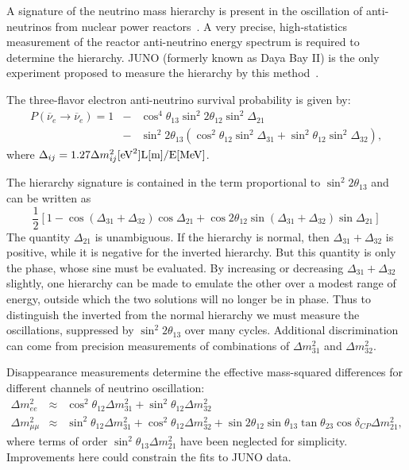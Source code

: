 A signature of the neutrino mass hierarchy is present in the
oscillation of anti-neutrinos from nuclear power
reactors~\cite{jlearned_PRD_2008}.  A very precise, high-statistics
measurement of the reactor anti-neutrino energy spectrum is required
to determine the hierarchy.  JUNO (formerly known as Daya Bay II) is
the only experiment 
proposed to measure the hierarchy by this
method~\cite{yfwang_INPA_2013}.  


The
three-flavor electron anti-neutrino survival probability is given by:
%
\begin{eqnarray} \label{eq:elecSurv}
P(\overline{\nu}_e\rightarrow \overline{\nu}_e) = 1&-&\cos^4\theta_{13}\sin^2 2\theta_{12} \sin^2 \Delta_{21} \nonumber \\
&-&\sin^2 2\theta_{13} (\cos^2\theta_{12}\sin^2 \Delta_{31}+\sin^2\theta_{12}\sin^2{\Delta_{32}}),
\end{eqnarray}
%
where $\Delta_{ij} = 1.27{\Delta}m^2_{ij}[\rm{eV}^2]L[{\rm m}]/E[{\rm
    MeV}]$.  
    
 The hierarchy signature is contained in the term proportional to $\sin^2 2\theta_{13}$ and can be written as
 \begin{equation}
\frac 12\left[1-\cos(\Delta_{31}+\Delta_{32})\cos\Delta_{21}+\cos 2\theta_{12}\sin(\Delta_{31}+\Delta_{32})\sin\Delta_{21}\right]
 \end{equation}  
 The quantity $\Delta_{21}$ is unambiguous.  If the hierarchy is normal, then   $\Delta_{31}+\Delta_{32}$ is positive, while it is negative for the inverted hierarchy.  But this quantity is only the phase, whose sine must be evaluated.  By increasing or decreasing $\Delta_{31}+\Delta_{32}$ slightly, one hierarchy can be made to emulate the other over a modest range of energy, outside which the two solutions will no longer be in phase.  Thus to distinguish the inverted from the normal hierarchy we must measure the oscillations, suppressed by $\sin^2 2\theta_{13}$ over many cycles.  Additional discrimination can come from precision measurements of combinations of $\Delta m^2_{31}$ and $\Delta m^2_{32}$.
 
Disappearance measurements determine the effective mass-squared differences for different channels of neutrino oscillation:
\begin{eqnarray}
\Delta m^2_{ee} &\approx& \cos^2\theta_{12} \Delta m^2_{31} + \sin^2\theta_{12} \Delta m^2_{32} \\
\Delta m^2_{\mu\mu}&\approx& \sin^2\theta_{12} \Delta m^2_{31} + \cos^2\theta_{12} \Delta m^2_{32} + \sin 2 \theta_{12}\sin\theta_{13}\tan\theta_{23}\cos\delta_{CP}\Delta m^2_{21},
\end{eqnarray}
where terms of order $\sin^2\theta_{13} \Delta m^2_{21}$ have been neglected for simplicity.  Improvements here could constrain the fits to JUNO data.

